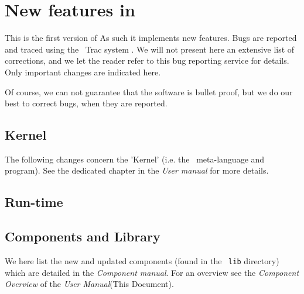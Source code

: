 
\chapter{New features in \MCX\ \version\ }
\label{c:changes}

This is the first version of \MCX\. As such it implements new features. Bugs are reported and traced using the \MCX\ Trac system \cite{mczilla_webpage}. We will not present here an extensive list of corrections, and we let the reader refer to this bug reporting service for details. Only important changes are indicated here.

Of course, we can not guarantee that the software is bullet proof, but we do our best to correct bugs, when they are reported.


\section{Kernel}
\label{s:new-features:kernel}

The following changes concern the 'Kernel' (i.e. the \MCS\ meta-language and program). See the dedicated chapter in the {\it User manual} for more details.


\section{Run-time}
\label{s:new-features:run-time}


\section{Components and Library}
\label{s:new-features:components}
 
We here list the new and updated components (found in the \MCX\ \verb+lib+ directory)
which are detailed in the {\it Component manual}. For an overview see the {\it Component Overview} of the {\it User Manual}(This Document).
